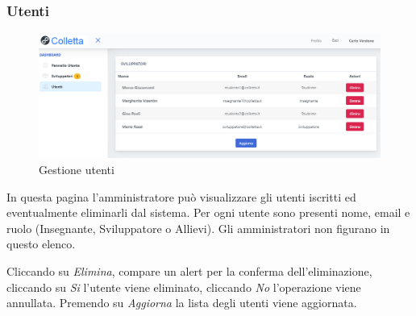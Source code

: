 		\subsubsection{Utenti}
			\begin{figure}[H]
				\centering
				\includegraphics[width=17cm]{sez/img/amministratore/gestisciutenti.PNG}
				\caption{Gestione utenti}\label{fig:1}
			\end{figure}
		  In questa pagina l'amministratore può visualizzare gli utenti iscritti ed eventualmente eliminarli dal sistema. Per ogni utente sono presenti nome, email e ruolo (Insegnante, Sviluppatore o Allievi). Gli amministratori non figurano in questo elenco. 
		  
		  Cliccando su \textit{Elimina}, compare un alert per la conferma dell'eliminazione, cliccando su \textit{Si} l'utente viene eliminato, cliccando \textit{No} l'operazione viene annullata. Premendo su \textit{Aggiorna} la lista degli utenti viene aggiornata.
